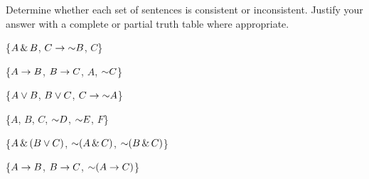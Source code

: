 \noindent\problempart
\label{pr.TT.consistent}
Determine whether each set of sentences is consistent or inconsistent. Justify your answer with a complete or partial truth table where appropriate.
\begin{earg}
\item \{$A \,\&\, B$, $C\rightarrow \mathord{\sim} B$, $C$\} \vspace{.5ex}%
\item \{$A\rightarrow B$, $B\rightarrow C$, $A$, $\mathord{\sim} C$\}\vspace{.5ex} %
\item \{$A \vee B$, $B\vee C$, $C\rightarrow \mathord{\sim} A$\}\vspace{.5ex} %
\item \{$A$, $B$, $C$, $\mathord{\sim} D$, $\mathord{\sim} E$, $F$\}\vspace{.5ex} %
\item \{$A \,\&\, (B \vee C)$, $\mathord{\sim}(A \,\&\, C)$, $\mathord{\sim}(B \,\&\, C)$\} \vspace{.5ex}%
\item \{$A \rightarrow B$, $B \rightarrow C$, $\mathord{\sim}(A \rightarrow C)$\} \vspace{.5ex} %


\end{earg}


